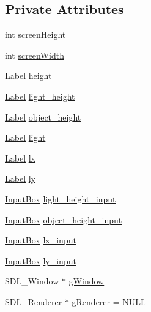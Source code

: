 \subsection*{Private Attributes}
\begin{DoxyCompactItemize}
\item 
int \mbox{\hyperlink{class_light_interface_aa9b68ae929eb75c73308d3a54938fbbb}{screen\+Height}}
\item 
int \mbox{\hyperlink{class_light_interface_a9277a0dc36c29a260049770cc1178a72}{screen\+Width}}
\item 
\mbox{\hyperlink{class_label}{Label}} \mbox{\hyperlink{class_light_interface_a6bc5e964dd25d0dc1e0355c46fe8d398}{height}}
\item 
\mbox{\hyperlink{class_label}{Label}} \mbox{\hyperlink{class_light_interface_aa58890ac548646f9dae6877b4f209537}{light\+\_\+height}}
\item 
\mbox{\hyperlink{class_label}{Label}} \mbox{\hyperlink{class_light_interface_a7817cd9d858aa380d92590c236fbdd29}{object\+\_\+height}}
\item 
\mbox{\hyperlink{class_label}{Label}} \mbox{\hyperlink{class_light_interface_aea6dc2cfd46096da7ce9957e14fda8ca}{light}}
\item 
\mbox{\hyperlink{class_label}{Label}} \mbox{\hyperlink{class_light_interface_a99575d767ffe06323a8d0e2c215db039}{lx}}
\item 
\mbox{\hyperlink{class_label}{Label}} \mbox{\hyperlink{class_light_interface_a0e6c3fe442d9e26743ac6dcd0fb116f1}{ly}}
\item 
\mbox{\hyperlink{class_input_box}{Input\+Box}} \mbox{\hyperlink{class_light_interface_a6f04fc8e8b866c75e2a6f5d22e5d1250}{light\+\_\+height\+\_\+input}}
\item 
\mbox{\hyperlink{class_input_box}{Input\+Box}} \mbox{\hyperlink{class_light_interface_ada7575dbd781d02d2bf5cf1f03db679e}{object\+\_\+height\+\_\+input}}
\item 
\mbox{\hyperlink{class_input_box}{Input\+Box}} \mbox{\hyperlink{class_light_interface_a523831c49e0ea55ccd889541f26ab7aa}{lx\+\_\+input}}
\item 
\mbox{\hyperlink{class_input_box}{Input\+Box}} \mbox{\hyperlink{class_light_interface_a227f5693a615fedfdd54ebe543136c8e}{ly\+\_\+input}}
\item 
S\+D\+L\+\_\+\+Window $\ast$ \mbox{\hyperlink{class_light_interface_a382f317eb245f9bd631766002b37e127}{g\+Window}}
\item 
S\+D\+L\+\_\+\+Renderer $\ast$ \mbox{\hyperlink{class_light_interface_a2913f291762246850a74fe760ea32d8c}{g\+Renderer}} = N\+U\+LL
\end{DoxyCompactItemize}



